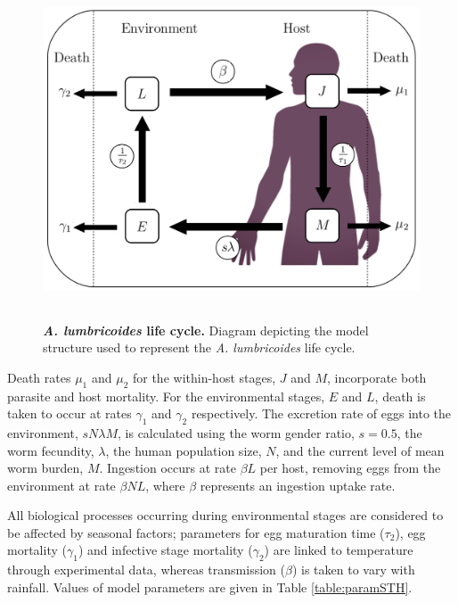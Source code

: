 \begin{figure}[h!]
\includegraphics[height=10cm]{Project/Figures/STH/Fig1.pdf}
\caption{{\bf \textit{A. lumbricoides} life cycle.} Diagram depicting the model structure used to represent the \textit{A. lumbricoides} life cycle.}
\label{Fig1}
\end{figure}

Death rates $\mu_1$ and $\mu_2$ for the within-host stages, $J$ and $M$, incorporate both parasite and host mortality. For the environmental stages, $E$ and $L$, death is taken to occur at rates $\gamma_1$ and $\gamma_2$ respectively. The excretion rate of eggs into the environment, $sN\lambda M$, is calculated using the worm gender ratio, $s=0.5$, the worm fecundity, $\lambda$, the human population size, $N$, and the current level of mean worm burden, $M$. Ingestion occurs at rate $\beta L$ per host, removing eggs from the environment at rate $\beta NL$, where $\beta$ represents an ingestion uptake rate. 

All biological processes occurring during environmental stages are considered to be affected by seasonal factors; parameters for egg maturation time ($\tau_2$), egg mortality ($\gamma_1$) and infective stage mortality ($\gamma_2$) are linked to temperature through experimental data, whereas transmission ($\beta$) is taken to vary with rainfall. Values of model parameters are given in Table \ref{table:paramSTH}.

